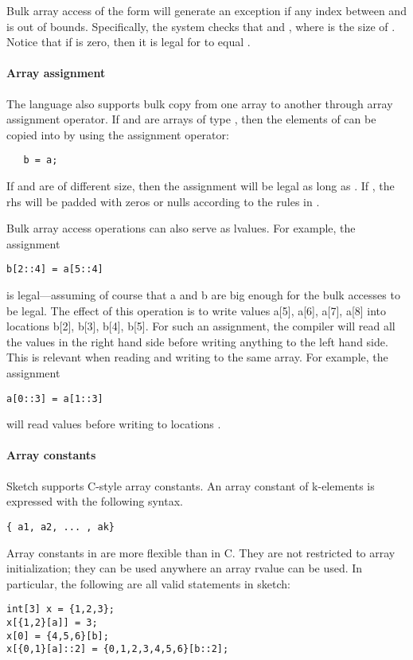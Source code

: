 Bulk array access of the form  will generate an exception if any index between  and  is out of bounds. Specifically, the system checks that  and , where  is the size of . Notice that if  is zero, then it is legal for  to equal .

\paragraph{Array assignment}
The language also supports bulk copy from one array to another through array assignment operator. If  and  are arrays of type , then the elements of   can be copied into  by using the assignment operator: 
\begin{lstlisting}
   b = a;
\end{lstlisting}
If  and  are of different size, then the assignment will be legal as long as . If , the rhs will be padded with zeros or nulls according to the rules in .

Bulk array access operations can also serve as lvalues. For example, the assignment 
\begin{lstlisting}
b[2::4] = a[5::4] 
\end{lstlisting}
is legal---assuming of course that a and b are big enough for the bulk accesses to be legal. The effect of this operation is to write values a[5], a[6], a[7], a[8] into locations b[2], b[3], b[4], b[5]. For such an assignment, the compiler will read all the values in the right hand side before writing anything to the left hand side. This is relevant when reading and writing to the same array. For example, the assignment 
\begin{lstlisting}
a[0::3] = a[1::3] 
\end{lstlisting}
will read values   before writing to locations  .

\paragraph{Array constants}
Sketch supports C-style array constants. An array constant of k-elements is expressed with the following syntax.
\begin{lstlisting}
{ a1, a2, ... , ak}
\end{lstlisting}
Array constants in \Sk{} are more flexible than in C. They are not restricted to array initialization; they can be used anywhere an array rvalue can be used. In particular, the following are all valid statements in sketch:
\begin{lstlisting}
int[3] x = {1,2,3};
x[{1,2}[a]] = 3;
x[0] = {4,5,6}[b];
x[{0,1}[a]::2] = {0,1,2,3,4,5,6}[b::2];
\end{lstlisting}

